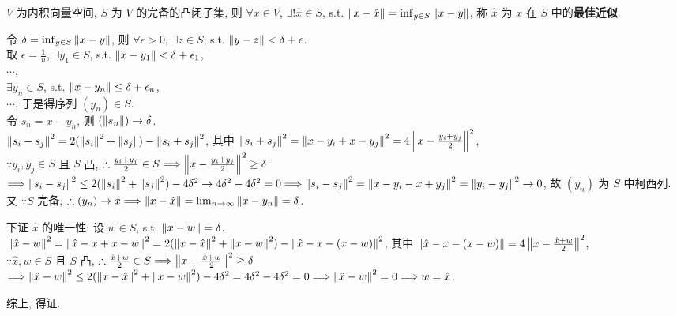 \documentclass{note}
\begin{document}
\begin{thm}[(课本定理 13.9)]\label{thm-13.9}
    $V$ 为内积向量空间, $S$ 为 $V$ 的完备的凸闭子集, 则 $\forall x\in V$, $\exists!\hat{x}\in S$, s.t. $\left\lVert x-\hat{x}\right\rVert=\inf_{y\in S}\left\lVert x-y\right\rVert$, 称 $\hat{x}$ 为 $x$ 在 $S$ 中的\textbf{最佳近似}.
\end{thm}
\begin{pf}
    令 $\delta=\inf_{y\in S}\left\lVert x-y\right\rVert$, 则 $\forall\epsilon>0$, $\exists z\in S$, s.t. $\left\lVert y-z\right\rVert<\delta+\epsilon$.\\
    取 $\epsilon=\frac{1}{n}$, $\exists y_1\in S$, s.t. $\left\lVert x-y_1\right\rVert<\delta+\epsilon_1$,\\
    $\cdots$,\\
    $\exists y_n\in S$, s.t. $\left\lVert x-y_n\right\rVert\leq\delta+\epsilon_n$,\\
    $\cdots$, 于是得序列 $(y_n)\in S$.\\
    令 $s_n=x-y_n$, 则 $(\left\lVert s_n\right\rVert)\rightarrow\delta$.\\
    $\left\lVert s_i-s_j\right\rVert^2=2(\left\lVert s_i\right\rVert^2+\left\lVert s_j\right\rVert)-\left\lVert s_i+s_j\right\rVert^2$, 其中 $\left\lVert s_i+s_j\right\rVert^2=\left\lVert x-y_i+x-y_j\right\rVert^2=4\left\lVert x-\frac{y_i+y_j}{2}\right\rVert^2$,\\
    $\because y_i,y_j\in S$ 且 $S$ 凸, $\therefore\frac{y_i+y_j}{2}\in S\Longrightarrow\left\lVert x-\frac{y_i+y_j}{2}\right\rVert^2\geq\delta$\\
    $\Longrightarrow\left\lVert s_i-s_j\right\rVert^2\leq 2(\left\lVert s_i\right\rVert^2+\left\lVert s_j\right\rVert^2)-4\delta^2\rightarrow 4\delta^2-4\delta^2=0\Longrightarrow\left\lVert s_i-s_j\right\rVert^2=\left\lVert x-y_i-x+y_j\right\rVert^2=\left\lVert y_i-y_j\right\rVert^2\rightarrow 0$, 故 $(y_n)$ 为 $S$ 中柯西列.\\
    又 $\because S$ 完备, $\therefore(y_n)\rightarrow x\Longrightarrow\left\lVert x-\hat{x}\right\rVert=\lim_{n\rightarrow\infty}\left\lVert x-y_n\right\rVert=\delta$.

    下证 $\hat{x}$ 的唯一性: 设 $w\in S$, s.t. $\left\lVert x-w\right\rVert=\delta$.\\
    $\left\lVert\hat{x}-w\right\rVert^2=\left\lVert\hat{x}-x+x-w\right\rVert^2=2(\left\lVert x-\hat{x}\right\rVert^2+\left\lVert x-w\right\rVert^2)-\left\lVert\hat{x}-x-(x-w)\right\rVert^2$, 其中 $\left\lVert\hat{x}-x-(x-w)\right\rVert=4\left\lVert x-\frac{\hat{x}+w}{2}\right\rVert^2$,\\
    $\because\hat{x},w\in S$ 且 $S$ 凸, $\therefore\frac{\hat{x}+w}{2}\in S\Longrightarrow\left\lVert x-\frac{\hat{x}+w}{2}\right\rVert^2\geq\delta$\\
    $\Longrightarrow\left\lVert\hat{x}-w\right\rVert^2\leq 2(\left\lVert x-\hat{x}\right\rVert^2+\left\lVert x-w\right\rVert^2)-4\delta^2=4\delta^2-4\delta^2=0\Longrightarrow\left\lVert\hat{x}-w\right\rVert^2=0\Longrightarrow w=\hat{x}$.

    综上, 得证.
\end{pf}
\end{document}
